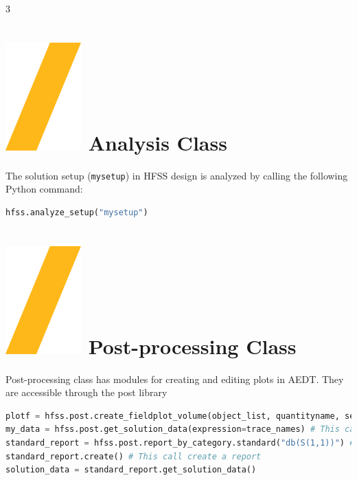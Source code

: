 \documentclass[9pt,landscape]{article}
\begin{document}
\begin{multicols}{3}
\section{\includegraphics[height=\fontcharht\font`\S]{slash.png} Analysis Class}
The solution setup (\texttt{mysetup}) in HFSS design is analyzed by calling the following Python command:
\begin{lstlisting}[language=Python]
hfss.analyze_setup("mysetup")
\end{lstlisting}
\section{\includegraphics[height=\fontcharht\font`\S]{slash.png} Post-processing Class}
Post-processing class has modules for creating and editing plots in AEDT. They are accessible through the post library
\begin{lstlisting}[language=Python]
plotf = hfss.post.create_fieldplot_volume(object_list, quantityname, setup_name, intrinsic_dict) # This call returns a FieldPlot object
my_data = hfss.post.get_solution_data(expression=trace_names) # This call returns a Solution Data object
standard_report = hfss.post.report_by_category.standard("db(S(1,1))") # This call returns a new standard report object
standard_report.create() # This call create a report
solution_data = standard_report.get_solution_data()
\end{lstlisting}


\end{multicols}
\end{document}

